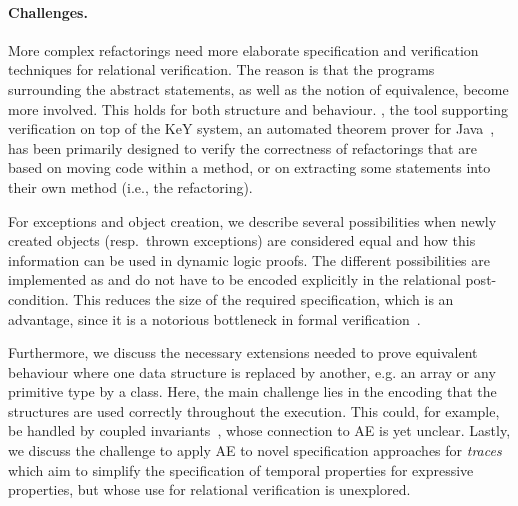 \paragraph{Challenges.}
More complex refactorings need more elaborate specification and verification techniques for relational verification. 
The reason is that the programs surrounding the abstract statements, as well as the notion of equivalence, become more involved.
This holds for both structure and behaviour.
 \Refinity{} \cite{steinhoefel:ae}, the tool supporting verification on top of the KeY system, an automated theorem prover for Java~\cite{DBLP:conf/aplas/Steinhofel20},
has been primarily designed to verify the correctness of refactorings that are based on moving code within a method, or on extracting some statements into their own method (i.e., the  refactoring).



For exceptions and object creation, we describe several possibilities when newly created objects (resp.\ thrown exceptions) are considered equal
and how this information can be used in dynamic logic proofs. The different possibilities are implemented as  and do not have to be encoded explicitly in the relational post-condition.
This reduces the size of the required specification, which is an advantage, since it is a notorious bottleneck in formal verification~\cite{DBLP:journals/corr/abs-1211-6186,DBLP:series/lncs/HahnleH19}.


Furthermore, we discuss the necessary extensions needed to prove equivalent behaviour where one data structure is replaced by another, e.g. an array or any primitive type by a class.
Here, the main challenge lies in the encoding that the structures are used correctly throughout the execution.
This could, for example, be handled by coupled invariants~\cite{DBLP:conf/birthday/BeckertU18}, whose connection to AE is yet unclear. 
Lastly, we discuss the challenge to apply AE to novel specification approaches for \emph{traces} which aim to simplify the specification of temporal properties for expressive properties, but whose use for relational verification is unexplored.

